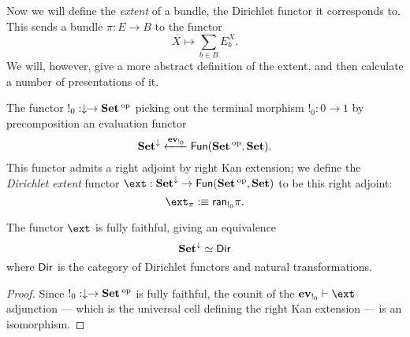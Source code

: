 Now we will define the \emph{extent} of a bundle, the Dirichlet functor it
corresponds to. This sends a bundle
$\pi : E \to B$ to the functor
$$X \mapsto \sum_{b \in B} E_b^X.$$
We will, however, give a more abstract definition of the extent, and then
calculate a number of presentations of it.

\begin{defn}
  The functor $!_0 : \downarrow \to \operatorname{\textbf{Set}}\operatorname{^\text{op}}$ picking out the terminal morphism
  $!_0 : 0 \to 1$ by precomposition an evaluation functor
  $$\operatorname{\textbf{Set}}^{\downarrow} \xleftarrow{\operatorname{\textbf{ev}}_{!_0}} \operatorname{\mathsf{{Fun}}}(\operatorname{\textbf{Set}}\operatorname{^\text{op}}, \operatorname{\textbf{Set}}).$$
  This functor admits a right adjoint by right Kan extension; we define the
  \emph{Dirichlet extent} functor $\ext : \Set^{\downarrow} \to \Fun(\Set\op,
  \Set)$ to be this right adjoint:
  $$\ext_{\pi} :\equiv \term{ran}_{!_0} \pi.$$
\end{defn}

\begin{prop}
  The functor $\ext$ is fully faithful, giving an equivalence
  $$\operatorname{\textbf{Set}}^{\downarrow} \simeq \operatorname{\mathsf{{Dir}}}$$
  where $\operatorname{\mathsf{{Dir}}}$ is the category of Dirichlet functors and natural transformations.
\end{prop}
\begin{proof}
Since $!_0 : \downarrow \to \operatorname{\textbf{Set}}\operatorname{^\text{op}}$ is fully faithful, the counit of the
$\ev_{!_0} \vdash \ext$ adjunction --- which is the universal cell defining the
right Kan extension --- is an isomorphism. 
\end{proof}

